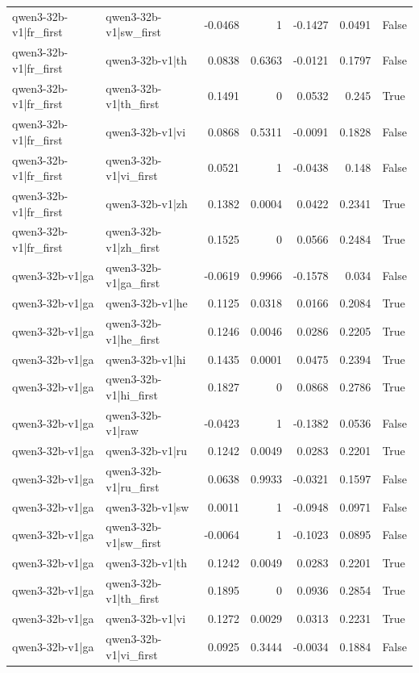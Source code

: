 \begin{table}
\begin{tabular}{l l r r r r l}
qwen3-32b-v1|fr_first & qwen3-32b-v1|sw_first & -0.0468 & 1 & -0.1427 & 0.0491 & False \\
qwen3-32b-v1|fr_first & qwen3-32b-v1|th & 0.0838 & 0.6363 & -0.0121 & 0.1797 & False \\
qwen3-32b-v1|fr_first & qwen3-32b-v1|th_first & 0.1491 & 0 & 0.0532 & 0.245 & True \\
qwen3-32b-v1|fr_first & qwen3-32b-v1|vi & 0.0868 & 0.5311 & -0.0091 & 0.1828 & False \\
qwen3-32b-v1|fr_first & qwen3-32b-v1|vi_first & 0.0521 & 1 & -0.0438 & 0.148 & False \\
qwen3-32b-v1|fr_first & qwen3-32b-v1|zh & 0.1382 & 0.0004 & 0.0422 & 0.2341 & True \\
qwen3-32b-v1|fr_first & qwen3-32b-v1|zh_first & 0.1525 & 0 & 0.0566 & 0.2484 & True \\
qwen3-32b-v1|ga & qwen3-32b-v1|ga_first & -0.0619 & 0.9966 & -0.1578 & 0.034 & False \\
qwen3-32b-v1|ga & qwen3-32b-v1|he & 0.1125 & 0.0318 & 0.0166 & 0.2084 & True \\
qwen3-32b-v1|ga & qwen3-32b-v1|he_first & 0.1246 & 0.0046 & 0.0286 & 0.2205 & True \\
qwen3-32b-v1|ga & qwen3-32b-v1|hi & 0.1435 & 0.0001 & 0.0475 & 0.2394 & True \\
qwen3-32b-v1|ga & qwen3-32b-v1|hi_first & 0.1827 & 0 & 0.0868 & 0.2786 & True \\
qwen3-32b-v1|ga & qwen3-32b-v1|raw & -0.0423 & 1 & -0.1382 & 0.0536 & False \\
qwen3-32b-v1|ga & qwen3-32b-v1|ru & 0.1242 & 0.0049 & 0.0283 & 0.2201 & True \\
qwen3-32b-v1|ga & qwen3-32b-v1|ru_first & 0.0638 & 0.9933 & -0.0321 & 0.1597 & False \\
qwen3-32b-v1|ga & qwen3-32b-v1|sw & 0.0011 & 1 & -0.0948 & 0.0971 & False \\
qwen3-32b-v1|ga & qwen3-32b-v1|sw_first & -0.0064 & 1 & -0.1023 & 0.0895 & False \\
qwen3-32b-v1|ga & qwen3-32b-v1|th & 0.1242 & 0.0049 & 0.0283 & 0.2201 & True \\
qwen3-32b-v1|ga & qwen3-32b-v1|th_first & 0.1895 & 0 & 0.0936 & 0.2854 & True \\
qwen3-32b-v1|ga & qwen3-32b-v1|vi & 0.1272 & 0.0029 & 0.0313 & 0.2231 & True \\
qwen3-32b-v1|ga & qwen3-32b-v1|vi_first & 0.0925 & 0.3444 & -0.0034 & 0.1884 & False \\

\end{tabular}
\end{table}
